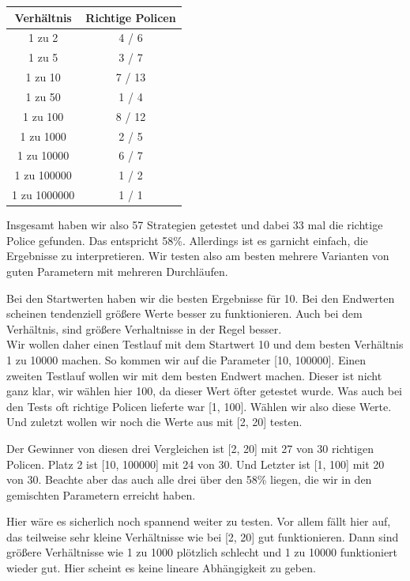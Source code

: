 \begin{table}[H]
	\centering
	\begin{tabular}{c|c}
	Verhältnis		& Richtige Policen	\\
	\hline
	1 zu 2		&	4 / 6			\\
	\hline
	1 zu 5		&	3 / 7			\\
	\hline
	1 zu 10		& 	7 / 13		\\
	\hline
	1 zu 50		& 	1 / 4			\\
	\hline
	1 zu 100		& 	8 / 12		\\
	\hline
	1 zu 1000		& 	2 / 5			\\
	\hline
	1 zu 10000		& 	6 / 7			\\
	\hline
	1 zu 100000	& 	1 / 2			\\
	\hline
	1 zu 1000000	& 	1 / 1
	\end{tabular}
\end{table} 

Insgesamt haben wir also 57 Strategien getestet und dabei 33 mal die richtige Police gefunden. Das entspricht 58\%. Allerdings ist es garnicht einfach, die Ergebnisse zu interpretieren. Wir testen also am besten mehrere Varianten von guten Parametern mit mehreren Durchläufen. 

Bei den Startwerten haben wir die besten Ergebnisse für 10. Bei den Endwerten scheinen tendenziell größere Werte besser zu funktionieren. Auch bei dem Verhältnis, sind größere Verhaltnisse in der Regel besser. \\

Wir wollen daher einen Testlauf mit dem Startwert 10 und dem besten Verhältnis 1 zu 10000 machen. So kommen wir auf die Parameter [10, 100000].
Einen zweiten Testlauf wollen wir mit dem besten Endwert machen. Dieser ist nicht ganz klar, wir wählen hier 100, da dieser Wert öfter getestet wurde. Was auch bei den Tests oft richtige Policen lieferte war [1, 100]. Wählen wir also diese Werte.
Und zuletzt wollen wir noch die Werte aus \citep{crawford2019reinforcement} mit [2, 20] testen.

Der Gewinner von diesen drei Vergleichen ist [2, 20] mit 27 von 30 richtigen Policen.
Platz 2 ist [10, 100000] mit 24 von 30. Und Letzter ist [1, 100] mit 20 von 30. Beachte aber das auch alle drei über den 58\% liegen, die wir in den gemischten Parametern erreicht haben.

Hier wäre es sicherlich noch spannend weiter zu testen. Vor allem fällt hier auf, das teilweise sehr kleine Verhältnisse wie bei [2, 20] gut funktionieren. Dann sind größere Verhältnisse wie 1 zu 1000 plötzlich schlecht und 1 zu 10000 funktioniert wieder gut. Hier scheint es keine lineare Abhängigkeit zu geben. \\


